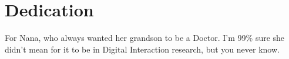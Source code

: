 \chapter*{Dedication}
For Nana, who always wanted her grandson to be a Doctor. I'm 99\% sure she didn't mean for it to be in Digital Interaction research, but you never know.